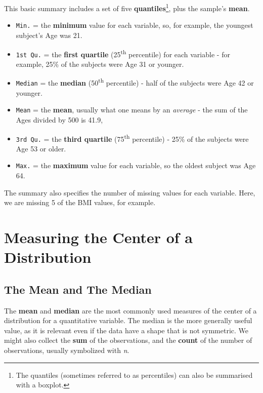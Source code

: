 \documentclass[
]{book}
\providecommand{\tightlist}{%
  \setlength{\itemsep}{0pt}\setlength{\parskip}{0pt}}
\begin{document}
This basic summary includes a set of five \textbf{quantiles}\footnote{The quantiles (sometimes referred to as percentiles) can also be summarised with a boxplot.}, plus the sample's \textbf{mean}.

\begin{itemize}
\tightlist
\item
  \texttt{Min.} = the \textbf{minimum} value for each variable, so, for example, the youngest subject's Age was 21.
\item
  \texttt{1st\ Qu.} = the \textbf{first quartile} (25\textsuperscript{th} percentile) for each variable - for example, 25\% of the subjects were Age 31 or younger.
\item
  \texttt{Median} = the \textbf{median} (50\textsuperscript{th} percentile) - half of the subjects were Age 42 or younger.
\item
  \texttt{Mean} = the \textbf{mean}, usually what one means by an \emph{average} - the sum of the Ages divided by 500 is 41.9,
\item
  \texttt{3rd\ Qu.} = the \textbf{third quartile} (75\textsuperscript{th} percentile) - 25\% of the subjects were Age 53 or older.
\item
  \texttt{Max.} = the \textbf{maximum} value for each variable, so the oldest subject was Age 64.
\end{itemize}

The summary also specifies the number of missing values for each variable. Here, we are missing 5 of the BMI values, for example.

\hypertarget{measuring-the-center-of-a-distribution}{%
\section{Measuring the Center of a Distribution}\label{measuring-the-center-of-a-distribution}}

\hypertarget{the-mean-and-the-median}{%
\subsection{The Mean and The Median}\label{the-mean-and-the-median}}

The \textbf{mean} and \textbf{median} are the most commonly used measures of the center of a distribution for a quantitative variable. The median is the more generally useful value, as it is relevant even if the data have a shape that is not symmetric. We might also collect the \textbf{sum} of the observations, and the \textbf{count} of the number of observations, usually symbolized with \emph{n}.
\end{document}

